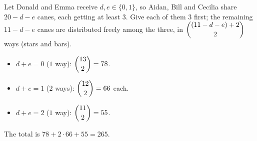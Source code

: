 Let Donald and Emma receive $d,e\in\{0,1\}$, so Aidan, Bill and Cecilia share $20-d-e$ canes, each getting at least $3$. Give each of them $3$ first; the remaining $11-d-e$ canes are distributed freely among the three, in $\dbinom{(11-d-e)+2}{2}$ ways (stars and bars).
\begin{itemize}
\item $d+e=0$ ($1$ way): $\dbinom{13}{2}=78$.
\item $d+e=1$ ($2$ ways): $\dbinom{12}{2}=66$ each.
\item $d+e=2$ ($1$ way): $\dbinom{11}{2}=55$.
\end{itemize}
The total is $78+2\cdot66+55=\boxed{265}$.
